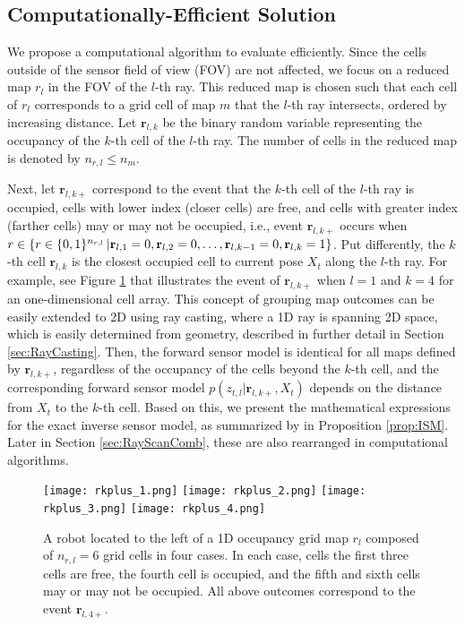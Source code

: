 \subsection{Computationally-Efficient Solution}

We propose a computational algorithm to evaluate  efficiently. 
Since the cells outside of the sensor field of view (FOV) are not affected, we focus on a reduced map $r_l$ in the FOV of the $l$-th ray. This reduced map is chosen such that each cell of $r_l$ corresponds to a grid cell of map $m$ that the $l$-th ray intersects, ordered by increasing distance. Let $\mathbf{r}_{l,k}$ be the binary random variable representing the occupancy of the $k$-th cell of the $l$-th ray. The number of cells in the reduced map is denoted by $n_{r,l}\leq n_m$.

Next, let $\mathbf{r}_{l,k+}$ correspond to the event that the $k$-th cell of the $l$-th ray is occupied, cells with lower index (closer cells) are free, and cells with greater index (farther cells) may or may not be occupied, i.e., event $\mathbf{r}_{l,k+}$ occurs when \\$r\in\left\{ r\in\{0,1\}^{{n_{r,l}}}\,|\mathbf{r}_{l,1}=0,\mathbf{r}_{l,2}=0,\ldots,\mathbf{r}_{l,k-1}=0,\mathbf{r}_{l,k}=1 \right\}$. Put differently, the $k$-th cell $\mathbf{r}_{l,k}$ is the closest occupied cell to current pose $X_t$ along the $l$-th ray. For example, see Figure \ref{fig:show_rkplus} that illustrates the event of $\mathbf{r}_{l,k+}$ when $l=1$ and $k=4$ for an one-dimensional cell array. This concept of grouping map outcomes can be easily extended to 2D using ray casting, where a 1D ray is spanning 2D space, which is easily determined from geometry, described in further detail in Section \ref{sec:RayCasting}. Then, the forward sensor model is identical for all maps defined by $\mathbf{r}_{l,k+}$, regardless of the occupancy of the cells beyond the $k$-th cell, and the corresponding forward sensor model $p(z_{t,l}|\mathbf{r}_{l,k+},X_{t})$ depends on the distance from $X_t$ to the $k$-th cell. Based on this, we present the mathematical expressions for the exact inverse sensor model, as summarized by  in Proposition \ref{prop:ISM}. Later in Section \ref{sec:RayScanComb}, these are also rearranged in computational algorithms. 



\begin{figure}
  \centering
  \texttt{[image: rkplus\_1.png]}
    \centering
  \texttt{[image: rkplus\_2.png]}  
  \centering
  \texttt{[image: rkplus\_3.png]}
    \centering
  \texttt{[image: rkplus\_4.png]}
  \caption{A robot located to the left of a 1D occupancy grid map $r_l$ composed of $n_{r,l}=6$ grid cells in four cases. In each case, cells the first three cells are free, the fourth cell is occupied, and the fifth and sixth cells may or may not be occupied. All above outcomes correspond to the event $\mathbf{r}_{l,4+}$.}
  \label{fig:show_rkplus}
\end{figure}

